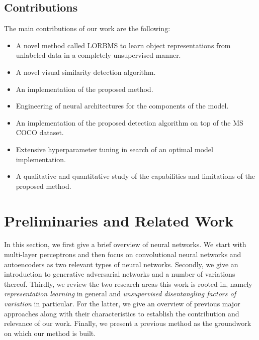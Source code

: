 \documentclass[a4paper,12pt]{report}
\begin{document}
\section{Contributions}
The main contributions of our work are the following:
\begin{itemize}
  \item A novel method called LORBMS to learn object representations from unlabeled data in a completely unsupervised manner.
  \item A novel visual similarity detection algorithm.
  \item An implementation of the proposed method.
  \item Engineering of neural architectures for the components of the model.
  \item An implementation of the proposed detection algorithm on top of the MS COCO dataset.
  \item Extensive hyperparameter tuning in search of an optimal model implementation.
  \item A qualitative and quantitative study of the capabilities and limitations of the proposed method.
\end{itemize}


\chapter{Preliminaries and Related Work}\label{sec:related_work}
In this section, we first give a brief overview of neural networks. We start with multi-layer perceptrons and then focus on convolutional neural networks and autoencoders as two relevant types of neural networks. Secondly, we give an introduction to generative adversarial networks and a number of variations thereof. Thirdly, we review the two research areas this work is rooted in, namely \emph{representation learning} in general and \emph{unsupervised disentangling factors of variation} in particular. For the latter, we give an overview of previous major approaches along with their characteristics to establish the contribution and relevance of our work. Finally, we present a previous method as the groundwork on which our method is built.
\end{document}
